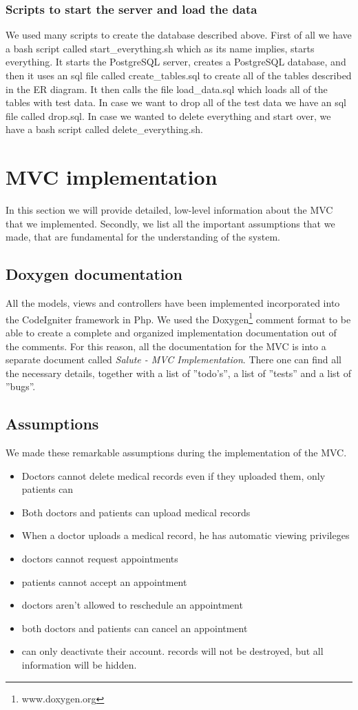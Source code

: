 \documentclass[10pt]{report}
\begin{document}
\subsubsection{Scripts to start the server and load the data}
We used many scripts to create the database described above.  First of all we have a bash script called start\_everything.sh which as its name implies, starts everything.  It starts the PostgreSQL server, creates a PostgreSQL database, and then it uses an sql file called create\_tables.sql to create all of the tables described in the ER diagram.  It then calls the file load\_data.sql which loads all of the tables with test data.  In case we want to drop all of the test data we have an sql file called drop.sql.  In case we wanted to delete everything and start over, we have a bash script called delete\_everything.sh. 

\section{MVC implementation}
\label{sec:mvcimplement}
In this section we will provide detailed, low-level information about the MVC that we implemented. Secondly, we list all the important assumptions that we made, that are fundamental for the understanding of the system.

\subsection{Doxygen documentation}
All the models, views and controllers have been implemented incorporated into the CodeIgniter framework in Php. We used the Doxygen\footnote{www.doxygen.org} comment format to be able to create a complete and organized implementation documentation out of the comments. For this reason, all the documentation for the MVC is into a separate document called \emph{Salute - MVC Implementation}. There one can find all the necessary details, together with a list of ''todo's'', a list of ''tests'' and a list of ''bugs''.

\subsection{Assumptions}
We made these remarkable assumptions during the implementation of the MVC.
\begin{itemize}
\item Doctors cannot delete medical records even if they uploaded them, only patients can
\item Both doctors and patients can upload medical records
\item When a doctor uploads a medical record, he has automatic viewing privileges
\item doctors cannot request appointments
\item patients cannot accept an appointment
\item doctors aren't allowed to reschedule an appointment
\item both doctors and patients can cancel an appointment
\item can only deactivate their account. records will not be destroyed, but all information will be hidden. 
\end{itemize}
\end{document}

